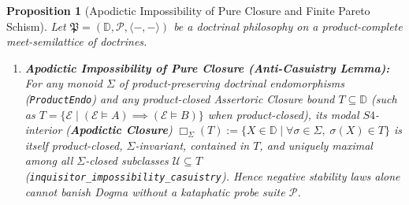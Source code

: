 \documentclass[10pt,twoside,openright]{book}
\theoremstyle{crmplain}
\newtheorem{proposition}[theorem]{Proposition}
\theoremstyle{crmdef}
\theoremstyle{crmremark}
\newcommand{\lean}[1]{\ignorespaces}
\newcommand{\leanwitness}{\ignorespaces}
\begin{document}
\begin{proposition}[Apodictic Impossibility of Pure Closure and Finite Pareto Schism]\label{prop:anti-casuistry-schism}%
\lean{HomotopyCRM.DoctrinalPhilosophy, HomotopyCRM.inquisitor_impossibility_casuistry, HomotopyCRM.monoid_proj1_iff_rightZero, HomotopyCRM.m1_projSub_and_not_localic, HomotopyCRM.vPoset_localic_not_proj1, HomotopyCRM.diamond_proj1_not_projSub, HomotopyCRM.not_catPresheafIAC_m1Cat, HomotopyCRM.not_catPresheafIAC_vPosetOpCat, HomotopyCRM.twoGroupCat_iac_and_not_ac, HomotopyCRM.freydCover_dogma_banishment, HomotopyCRM.choiceConcl_ne_extProj, HomotopyCRM.pareto_incomparable_projSub_localic, HomotopyCRM.M1SliceLTT.m1_slice_lt_count}%
\leanwitness%
%
Let $\mathfrak{P} = (\mathbb{D}, \mathcal{P}, \langle -, - \rangle)$ be a doctrinal philosophy on a product-complete meet-semilattice of doctrines.
\begin{enumerate}[label=\textup{(\roman*)},leftmargin=2.0em]
  \item \textbf{Apodictic Impossibility of Pure Closure (Anti-Casuistry Lemma):} For any monoid $\Sigma$ of product-preserving doctrinal endomorphisms (\texttt{ProductEndo}) and any product-closed Assertoric Closure bound $T \subseteq \mathbb{D}$ (such as $T = \{\mathcal{E} \mid (\mathcal{E} \models A) \implies (\mathcal{E} \models B)\}$ when product-closed), its modal $S4$-interior (\textbf{Apodictic Closure}) $\Box_\Sigma(T) := \{X \in \mathbb{D} \mid \forall \sigma \in \Sigma,\; \sigma(X) \in T\}$ is itself product-closed, $\Sigma$-invariant, contained in $T$, and uniquely maximal among all $\Sigma$-closed subclasses $\mathcal{U} \subseteq T$ (\texttt{inquisitor\_\allowbreak impossibility\_\allowbreak casuistry}). Hence negative stability laws alone cannot banish Dogma without a kataphatic probe suite $\mathcal{P}$.

\end{enumerate}
\end{proposition}
\end{document}
